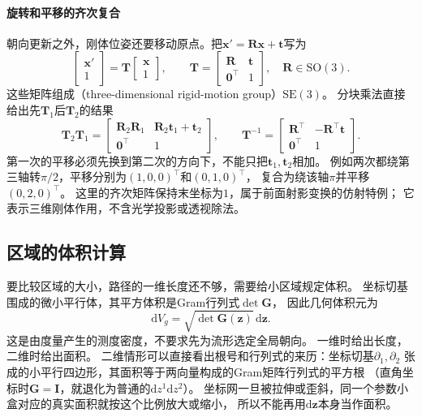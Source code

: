 \paragraph{旋转和平移的齐次复合}
朝向更新之外，刚体位姿还要移动原点。把$\bm x'=\bm R\bm x+\bm t$写为
\[
 \begin{bmatrix}\bm x'\\1\end{bmatrix}
 =\bm T\begin{bmatrix}\bm x\\1\end{bmatrix},
 \qquad
 \bm T=\begin{bmatrix}\bm R&\bm t\\\bm0^\top&1\end{bmatrix},
 \quad \bm R\in\mathrm{SO}(3).
\]
这些矩阵组成（three-dimensional rigid-motion group）$\mathrm{SE}(3)$。
分块乘法直接给出先$\bm T_1$后$\bm T_2$的结果
\[
 \bm T_2\bm T_1=
 \begin{bmatrix}\bm R_2\bm R_1&\bm R_2\bm t_1+\bm t_2\\\bm0^\top&1\end{bmatrix},
 \qquad
 \bm T^{-1}=\begin{bmatrix}\bm R^\top&-\bm R^\top\bm t\\\bm0^\top&1\end{bmatrix}.
\]
第一次的平移必须先换到第二次的方向下，不能只把$\bm t_1,\bm t_2$相加。
例如两次都绕第三轴转$\pi/2$，平移分别为$(1,0,0)^\top$和$(0,1,0)^\top$，
复合为绕该轴$\pi$并平移$(0,2,0)^\top$。
这里的齐次矩阵保持末坐标为$1$，属于前面射影变换的仿射特例；
它表示三维刚体作用，不含光学投影或透视除法。

\subsection{区域的体积计算}
\label{sec:geometry-riemannian-volume}

要比较区域的大小，路径的一维长度还不够，需要给小区域规定体积。
坐标切基围成的微小平行体，其平方体积是Gram行列式$\det\bm G$，
因此几何体积元为
\begin{equation}
 \mathrm dV_g=\sqrt{\det\bm G(\bm z)}\,\mathrm d\bm z.
 \label{eq:geometry-riemannian-volume}
\end{equation}
这是由度量产生的测度密度，不要求先为流形选定全局朝向。
一维时给出长度，二维时给出面积。
二维情形可以直接看出根号和行列式的来历：坐标切基$\partial_1,\partial_2$
张成的小平行四边形，其面积等于两向量构成的Gram矩阵行列式的平方根
（直角坐标时$\bm G=\bm I$，就退化为普通的$\mathrm dz^1\mathrm dz^2$）。
坐标网一旦被拉伸或歪斜，同一个参数小盒对应的真实面积就按这个比例放大或缩小，
所以不能再用$\mathrm d\bm z$本身当作面积。

